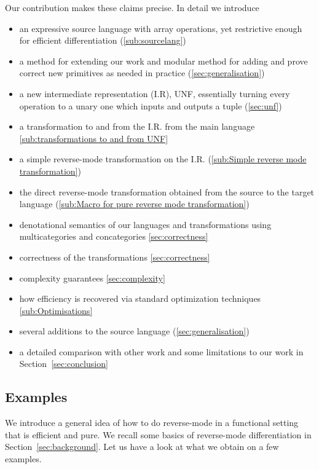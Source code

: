 Our contribution makes these claims precise. In detail we introduce
\begin{itemize}
    \item an expressive source language with array operations, yet restrictive enough for efficient differentiation (\ref{sub:sourcelang})
    \item a method for extending our work and modular method for adding and prove correct new primitives as needed in practice (\ref{sec:generalisation})
    \item a new intermediate representation (I.R), UNF, essentially turning every operation to a unary one which inputs and outputs a tuple (\ref{sec:unf})
    \item a transformation to and from the I.R. from the main language \ref{sub:transformations to and from UNF}
    \item a simple reverse-mode transformation on the I.R. (\ref{sub:Simple reverse mode transformation})
    \item the direct reverse-mode transformation obtained from the source to the target language (\ref{sub:Macro for pure reverse mode transformation})
    \item denotational semantics of our languages and transformations using multicategories and concategories \ref{sec:correctness}
    \item correctness of the transformations \ref{sec:correctness}
    \item complexity guarantees \ref{sec:complexity}
    \item how efficiency is recovered via standard optimization techniques \ref{sub:Optimisations}
    \item several additions to the source language (\ref{sec:generalisation}) 
    \item a detailed comparison with other work and some limitations to our work in Section~\ref{sec:conclusion}
\end{itemize}

\subsection{Examples}

We introduce a general idea of how to do reverse-mode in a functional setting that is efficient and pure.
We recall some basics of reverse-mode differentiation in Section~\ref{sec:background}.
Let us have a look at what we obtain on a few examples.

